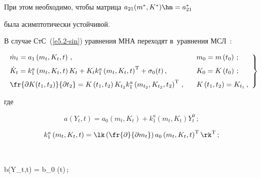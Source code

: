 При этом необходимо, чтобы матрица  $a_{21} ( m^*, K^*)\hm= a^*_{21}$ 

была асимптотически устойчивой.



В случае СтС~(\ref{e5.2-sin}) уравнения МНА переходят в~уравнения МСЛ~\cite{1-sin, 6-sin, 7-sin}:

     \begin{equation}

     \left.

     \begin{array}{ll}

     \dot m_t = a_1 \left(m_t, K_t, t\right)\,,\enskip &\

     m_0 = m\left(t_0\right)\,;

     \\[6pt]

     \dot K_t = k_1^a \left(m_t, K_t, t\right) K_t + K_t k_1^a 

     \left(m_t, K_t, t\right)^{\mathrm{T}} +\sigma_0(t)\,,\enskip  &\ K_0= K\left(t_0\right)\,;

     \\[6pt]

\displaystyle \fr{\partial K(t_1, t_2)}{\partial t_2} = K\left(t_1, t_2\right) K_{t_2} 

k_1^a \left(m_{t_2}, K_{t_2}, t_2\right)^{\mathrm{T}}\,,\enskip  &\

K\left(t_1, t_2\right) = K_{t_1}\,,

\end{array}

\right\}

\label{e5.7-sin}

\end{equation}

где

    $$

    a\left(Y_t,t\right) = a_0 \left(m_t, K_t\right) + k_1^a \left(m_t, K_t\right) 

    Y_t^0\,;$$

    $$

    k_1^a  \left(m_t, K_t, t\right) =

    \lk \left(\fr{\partial}{\partial m_t} \right)a_0 \left(m_t, K_t, t\right)^{\mathrm{T}}

    \rk^{\mathrm{T}}\,;

    $$

    $$

    b\left(Y_t,t\right) = b_0 (t)\,;\enskip 

